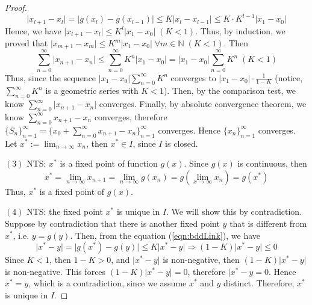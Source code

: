 \documentclass{article}
\theoremstyle{definition}
\theoremstyle{remark}
\begin{document}
\begin{proof}
    \begin{equation}
        \rvert x_{l + 1} - x_l \rvert = \lvert g(x_l) - g(x_{l-1}) \rvert \leq K \lvert x_l - x_{l-1}\rvert \leq K \cdot K^{l-1} \rvert x_1 - x_0 \rvert
    \end{equation}
    Hence, we have $\lvert x_{l+1} - x_l \rvert \leq K^l \lvert x_1 - x_0 \rvert \; (K < 1)$. Thus, by induction, we proved that $\lvert x_{m+1} - x_m \rvert \leq K^m \lvert x_1 - x_0 \rvert \; \forall m \in \mathbb{N} \; (K < 1)$. Then 
    \begin{equation}\label{eqn:comparison}
        \sum_{n = 0}^{\infty}{\lvert x_{n+1} - x_n \rvert} \leq \sum_{n = 0}^{\infty}{K^n\lvert x_1 - x_0 \rvert} = \lvert x_1 - x_0 \rvert \sum_{n = 0}^{\infty}{K^n} \; (K < 1)
    \end{equation}
    Thus, since the sequence $\lvert x_1 - x_0 \rvert \sum_{n = 0}^{\infty}{K^n}$ converges to $\lvert x_1 - x_0 \rvert \cdot \tfrac{1}{1-K}$ (notice, $\sum_{n = 0}^{\infty}{K^n}$ is a geometric series with $K < 1$). Then, by the comparison test, we know $\sum_{n = 0}^{\infty}{\lvert x_{n+1} - x_n \rvert}$ converges. Finally, by absolute convergence theorem, we know $\sum_{n = 0}^{\infty}{x_{n+1} - x_n}$ converges, therefore $\{S_n\}_{n = 1}^{\infty} = \{x_0 + \sum_{n = 0}^{\infty}{x_{n+1} - x_n}\}_{n = 1}^{\infty}$ converges. Hence $\{x_n\}_{n = 1}^{\infty}$ converges. Let $x^{*} := \lim_{n \to \infty}{x_n}$, then $x^{*} \in I$, since $I$ is closed.
    
    $(3)$ NTS: $x^{*}$ is a fixed point of function $g(x)$. \; Since $g(x)$ is continuous, then
    \begin{equation}
        x^{*} = \lim_{n\to \infty}{x_{n+1}} = \lim_{n \to \infty}{g(x_n)} = g(\lim_{x \to \infty}{x_n}) = g(x^{*})
    \end{equation}
    Thus, $x^{*}$ is a fixed point of $g(x)$.
    
    $(4)$ NTS: the fixed point $x^{*}$ is unique in $I$. \; We will show this by contradiction. Suppose by contradiction that there is another fixed point $y$ that is different from $x^{*}$, i.e. $y = g(y)$. Then, from the equation (\ref{eqn:bddLink}), we have
    \begin{equation}
        \lvert x^{*} - y \rvert = \lvert g(x^{*}) - g(y) \rvert \leq K \lvert x^{*} - y \rvert \Rightarrow (1-K)\lvert x^{*} - y \rvert \leq 0
    \end{equation}
    Since $K < 1$, then $1 - K > 0$, and $\lvert x^{*} - y \rvert$ is non-negative, then $(1-K)\lvert x^{*} - y \rvert$ is non-negative. This forces $(1-K)\lvert x^{*} - y \rvert = 0$, therefore $\lvert x^{*} - y = 0$. Hence $x^{*} = y$, which is a contradiction, since we assume $x^{*}$ and $y$ distinct. Therefore, $x^{*}$ is unique in $I$.
\end{proof}
\end{document}
